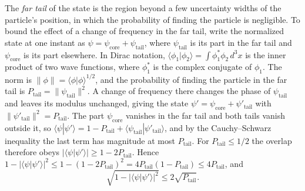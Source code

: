 \documentclass[aps,prd,onecolumn,tightenlines,nofootinbib,notitlepage,11pt,floatfix]{revtex4-2}
\theoremstyle{indentedtheorem}
\begin{document}
The \emph{far tail} of the state is the region beyond a few uncertainty widths of the particle's position, in which the probability of finding the particle is negligible. To bound the effect of a change of frequency in the far tail, write the normalized state at one instant as $\psi=\psi_\text{core}+\psi_\text{tail}$, where $\psi_\text{tail}$ is its part in the far tail and $\psi_\text{core}$ is its part elsewhere. In Dirac notation, $\langle\phi_1|\phi_2\rangle=\int\phi_1^*\phi_2\,d^3x$ is the inner product of two wave functions, where $\phi_1^*$ is the complex conjugate of $\phi_1$. The norm is $\|\phi\|=\langle\phi|\phi\rangle^{1/2}$, and the probability of finding the particle in the far tail is $P_\text{tail}=\|\psi_\text{tail}\|^2$. A change of frequency there changes the phase of $\psi_\text{tail}$ and leaves its modulus unchanged, giving the state $\psi'=\psi_\text{core}+\psi'_\text{tail}$ with $\|\psi'_\text{tail}\|^2=P_\text{tail}$. The part $\psi_\text{core}$ vanishes in the far tail and both tails vanish outside it, so $\langle\psi|\psi'\rangle=1-P_\text{tail}+\langle\psi_\text{tail}|\psi'_\text{tail}\rangle$, and by the Cauchy--Schwarz inequality the last term has magnitude at most $P_\text{tail}$. For $P_\text{tail}\le 1/2$ the overlap therefore obeys $|\langle\psi|\psi'\rangle|\ge 1-2P_\text{tail}$. Hence $1-|\langle\psi|\psi'\rangle|^2\le 1-(1-2P_\text{tail})^2=4P_\text{tail}(1-P_\text{tail})\le 4P_\text{tail}$, and
\begin{equation}
    \sqrt{1-|\langle\psi|\psi'\rangle|^2} \le 2\sqrt{P_\text{tail}} .
    \label{eq:tail_distance}
\end{equation}
\end{document}
